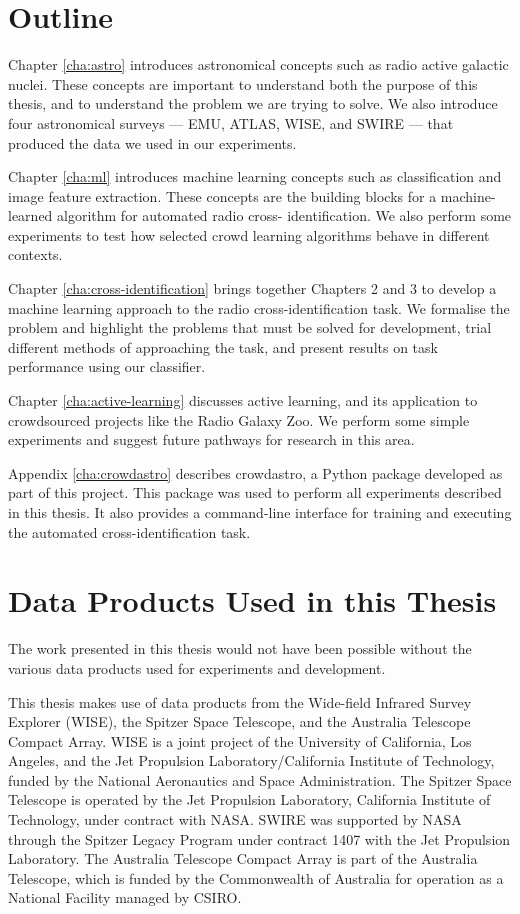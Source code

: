 \section{Outline}
\label{sec:outline}
  
  Chapter \ref{cha:astro} introduces astronomical concepts such as radio active
  galactic nuclei. These concepts are important to understand both the purpose
  of this thesis, and to understand the problem we are trying to solve. We also
  introduce four astronomical surveys --- EMU, ATLAS, WISE, and SWIRE --- that
  produced the data we used in our experiments.

  Chapter \ref{cha:ml} introduces machine learning concepts such as
  classification and image feature extraction. These concepts are the building
  blocks for a machine-learned algorithm for automated radio cross-
  identification. We also perform some experiments to test how selected crowd
  learning algorithms behave in different contexts.

  Chapter \ref{cha:cross-identification} brings together Chapters 2 and 3 to
  develop a machine learning approach to the radio cross-identification task. We
  formalise the problem and highlight the problems that must be solved for
  development, trial different methods of approaching the task, and present
  results on task performance using our classifier.

  Chapter \ref{cha:active-learning} discusses active learning, and its
  application to crowdsourced projects like the Radio Galaxy Zoo. We perform
  some simple experiments and suggest future pathways for research in this area.

  Appendix \ref{cha:crowdastro} describes crowdastro, a Python package developed
  as part of this project. This package was used to perform all experiments
  described in this thesis. It also provides a command-line interface for
  training and executing the automated cross-identification task.

\section{Data Products Used in this Thesis}
\label{sec:data-products}
  
  The work presented in this thesis would not have been possible without the
  various data products used for experiments and development.

  This thesis makes use of data products from the Wide-field Infrared Survey
  Explorer (WISE), the Spitzer Space Telescope, and the Australia Telescope
  Compact Array. WISE is a joint project of the University of California, Los
  Angeles, and the Jet Propulsion Laboratory/California Institute of Technology,
  funded by the National Aeronautics and Space Administration. The Spitzer Space
  Telescope is operated by the Jet Propulsion Laboratory, California Institute
  of Technology, under contract with NASA. SWIRE was supported by NASA through
  the Spitzer Legacy Program under contract 1407 with the Jet Propulsion
  Laboratory. The Australia Telescope Compact Array is part of the Australia
  Telescope, which is funded by the Commonwealth of Australia for operation as a
  National Facility managed by CSIRO.

